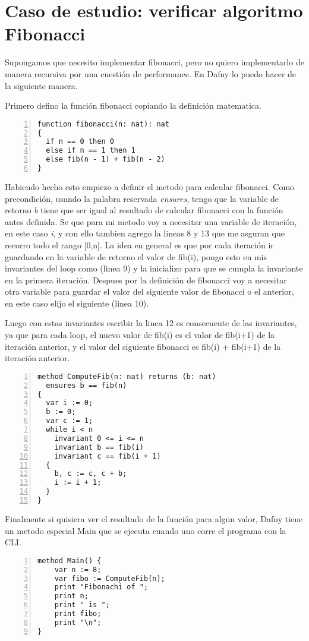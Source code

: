 \documentclass[runningheads]{llncs}
\begin{document}
\section{Caso de estudio: verificar algoritmo Fibonacci}
Supongamos que necesito implementar fibonacci, pero no quiero implementarlo de manera recursiva por una cuestión de performance. En Dafny lo puedo hacer de la siguiente manera.

Primero defino la función fibonacci copiando la definición matematica.
\begin{Verbatim}[numbers=left,xleftmargin=5mm]
function fibonacci(n: nat): nat
{
  if n == 0 then 0
  else if n == 1 then 1
  else fib(n - 1) + fib(n - 2)
}
\end{Verbatim}

Habiendo hecho esto empiezo a definir el metodo para calcular fibonacci.
Como precondición, usando la palabra reservada \textit{ensures}, tengo que la variable de retorno \textit{b} tiene que ser igual al resultado de calcular fibonacci con la función antes definida.
Se que para mi metodo voy a necesitar una variable de iteración, en este caso \textit{i}, y con ello tambien agrego la lineas 8 y 13 que me asguran que recorro todo el rango [0,n].
La idea en general es que por cada iteración ir guardando en la variable de retorno el valor de fib(i), pongo esto en mis invariantes del loop como (linea 9) y la inicializo para que se cumpla la invariante en la primera iteración. Despues por la definición de fibonacci voy a necesitar otra variable para guardar el valor del siguiente valor de fibonacci o el anterior, en este caso elijo el siguiente (linea 10).

Luego con estas invariantes escribir la linea 12 es consecuente de las invariantes, ya que para cada loop, el nuevo valor de fib(i) es el valor de fib(i+1) de la iteración anterior, y el valor del siguiente fibonacci es fib(i) + fib(i+1) de la iteración anterior.
\begin{Verbatim}[numbers=left,xleftmargin=5mm]
method ComputeFib(n: nat) returns (b: nat)
  ensures b == fib(n)
{
  var i := 0;
  b := 0;
  var c := 1;
  while i < n
    invariant 0 <= i <= n
    invariant b == fib(i)
    invariant c == fib(i + 1)
  {
    b, c := c, c + b;
    i := i + 1;
  }
}
\end{Verbatim}
Finalmente si quisiera ver el resultado de la función para algun valor, Dafny tiene un metodo especial Main que se ejecuta cuando uno corre el programa con la CLI.
\begin{Verbatim}[numbers=left,xleftmargin=5mm]
method Main() {
    var n := 8;
    var fibo := ComputeFib(n);
    print "Fibonachi of ";
    print n;
    print " is ";
    print fibo;
    print "\n";
}
\end{Verbatim}
\end{document}
